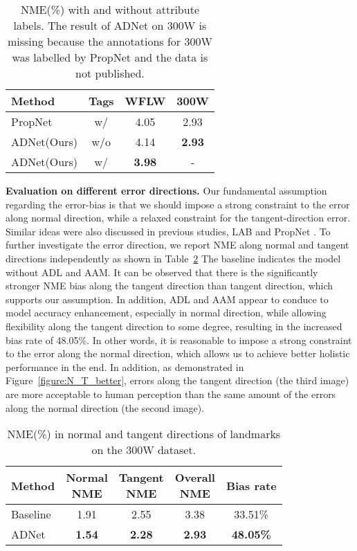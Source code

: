 \documentclass[10pt,twocolumn,letterpaper]{article}
\begin{document}
\begin{table}[ht]
\begin{center}
\begin{tabular}{|l|c|c|c|}
\hline
Method & Tags & WFLW & 300W \\
\hline
PropNet & w/ & 4.05 & 2.93 \\
\hline
ADNet(Ours) & w/o & 4.14 & \textbf{2.93} \\
\hline
ADNet(Ours) & w/ & \textbf{3.98} & - \\
\hline
\end{tabular}
\end{center}
\caption{NME(\%) with and without attribute labels. The result of ADNet on 300W is missing because the annotations for 300W was labelled by PropNet and the data is not published.}
\label{table:attributes}
\end{table}


\noindent\textbf{Evaluation on different error directions.}
Our fundamental assumption regarding the error-bias is that we should impose a strong constraint to the error along normal direction, while a relaxed constraint for the tangent-direction error.
Similar ideas were also discussed in previous studies, LAB \cite{wu2018look} and PropNet \cite{huang2020propagationnet}.
To further investigate the error direction, we report NME along normal and tangent directions independently as shown in Table~\ref{table:directions}
The baseline indicates the model without ADL and AAM. 
It can be observed that there is the significantly stronger NME bias along the tangent direction than tangent direction, which supports our assumption.
In addition, ADL and AAM appear to conduce to model accuracy enhancement, especially in normal direction, while allowing flexibility along the tangent direction to some degree, resulting in the increased bias rate of 48.05\%.
In other words, it is reasonable to impose a strong constraint to the error along the normal direction, which allows us to achieve better holistic performance in the end.
In addition, as demonstrated in Figure~\ref{figure:N_T_better}, errors along the tangent direction (the third image) are more acceptable to human perception than the same amount of the errors along the normal direction (the second image).


\begin{table}
\begin{center}
\begin{tabular}{|l|c|c|c|c|}
\hline
Method & \makecell{Normal \\ NME} & \makecell{Tangent \\ NME} & \makecell{Overall \\ NME} & Bias rate \\
\hline
Baseline & 1.91 & 2.55 & 3.38 & 33.51\% \\
\hline
ADNet & \textbf{1.54} & \textbf{2.28} & \textbf{2.93} & \textbf{48.05\%} \\
\hline
\end{tabular}
\end{center}
\caption{NME(\%) in normal and tangent directions of landmarks on the 300W dataset.}
\label{table:directions}
\end{table}
\end{document}

